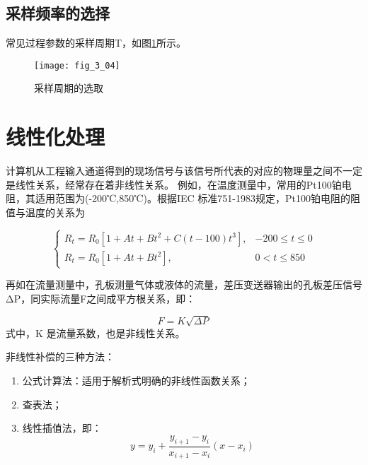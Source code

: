 \subsection{采样频率的选择}

常见过程参数的采样周期T，如图\ref{fig_3_04}所示。

\begin{figure}[h]
  \centering
  \texttt{[image: fig\_3\_04]}\\
  \caption{采样周期的选取}\label{fig_3_04}
\end{figure}





\section{线性化处理}


计算机从工程输入通道得到的现场信号与该信号所代表的对应的物理量之间不一定是线性关系，经常存在着非线性关系。
例如，在温度测量中，常用的Pt100铂电阻，其适用范围为(-200℃,850℃)。根据IEC 标准751-1983规定，Pt100铂电阻的阻值与温度的关系为


\begin{displaymath}
\left\{ \begin{array}{ll}
R_t = R_0[1+At+Bt^2+C(t-100)t^3], & \textrm{$-200\le t \le 0$}\\
R_t = R_0[1+At+Bt^2], & \textrm{$0 < t \le 850$}
\end{array} \right.
\end{displaymath}

再如在流量测量中，孔板测量气体或液体的流量，差压变送器输出的孔板差压信号ΔP，同实际流量F之间成平方根关系，即：

\begin{equation}
  F=K\sqrt{\Delta P}
\end{equation}
式中，K 是流量系数，也是非线性关系。

非线性补偿的三种方法：

\begin{enumerate}
  \item 公式计算法：适用于解析式明确的非线性函数关系；
  \item 查表法；
  \item 线性插值法，即：
  \begin{equation}
y=y_i+\frac{y_{i+1}-y_i}{x_{i+1}-x_i}(x-x_i)
\end{equation}
\end{enumerate}




